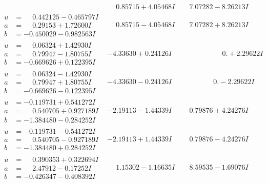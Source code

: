 \documentclass[1p]{elsarticle_modified}
\theoremstyle{definition}
\begin{document}
$$\begin{array}{c|c|c}
 & \phantom{-}0.85715 + 4.05468 I & \phantom{-}7.07282 - 8.26213 I \\ \hline\begin{aligned}
u &= \phantom{-}0.442125 - 0.465797 I \\
a &= \phantom{-}0.29153 + 1.72600 I \\
b &= -0.450029 - 0.982563 I\end{aligned}
 & \phantom{-}0.85715 - 4.05468 I & \phantom{-}7.07282 + 8.26213 I \\ \hline\begin{aligned}
u &= \phantom{-}0.06324 + 1.42930 I \\
a &= \phantom{-}0.79947 - 1.80755 I \\
b &= -0.669626 + 0.122395 I\end{aligned}
 & -4.33630 + 0.24126 I & \phantom{-0.000000 -}0. + 2.29622 I \\ \hline\begin{aligned}
u &= \phantom{-}0.06324 - 1.42930 I \\
a &= \phantom{-}0.79947 + 1.80755 I \\
b &= -0.669626 - 0.122395 I\end{aligned}
 & -4.33630 - 0.24126 I & \phantom{-0.000000 } 0. - 2.29622 I \\ \hline\begin{aligned}
u &= -0.119731 + 0.541272 I \\
a &= \phantom{-}0.540705 + 0.927189 I \\
b &= -1.384480 - 0.284252 I\end{aligned}
 & -2.19113 - 1.44339 I & \phantom{-}0.79876 + 4.24276 I \\ \hline\begin{aligned}
u &= -0.119731 - 0.541272 I \\
a &= \phantom{-}0.540705 - 0.927189 I \\
b &= -1.384480 + 0.284252 I\end{aligned}
 & -2.19113 + 1.44339 I & \phantom{-}0.79876 - 4.24276 I \\ \hline\begin{aligned}
u &= \phantom{-}0.390353 + 0.322694 I \\
a &= \phantom{-}2.47912 - 0.17252 I \\
b &= -0.426347 - 0.408392 I\end{aligned}
 & \phantom{-}1.15302 - 1.16635 I & \phantom{-}8.59535 - 1.69076 I \\ \hline\begin{aligned}

\end{aligned}
\end{array}$$
\end{document}
